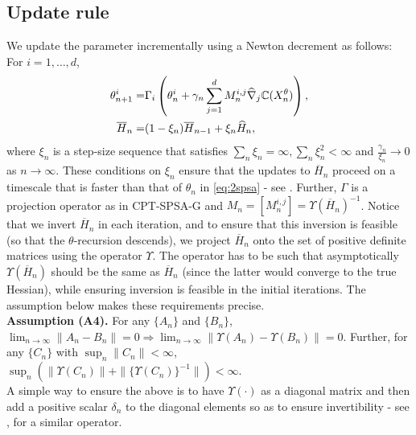 \subsection{Update rule}
We update the parameter incrementally using a Newton decrement as follows: For $i=1,\ldots,d$,
\begin{align}
\label{eq:2spsa}
\theta^{i}_{n+1} =& \Gamma_{i}\left(\theta^{i}_n + \gamma_n \sum_{j=1}^{d} M_n^{i,j} \widehat \nabla_{j} \mathbb{C}(X^\theta_n)\right), \\
\overline H_n = & (1-\xi_n) \overline H_{n-1} + \xi_n \widehat H_n,\label{eq:2spsa-H}
\end{align}
where $\xi_n$ is a step-size sequence that satisfies 
$\sum_{n} \xi_n = \infty, \sum_n \xi_n^2 < \infty$ and $\frac{\gamma_n}{\xi_n}\rightarrow 0$ as $n\rightarrow \infty$. These conditions on $\xi_n$ ensure that the updates to $\overline H_n$ proceed on a timescale that is faster than that of $\theta_n$ in \eqref{eq:2spsa} - see \cite[Chapter 6]{borkar2008stochastic}.
Further, $\Gamma$ is a projection operator as in CPT-SPSA-G and  $M_n = [M_n^{i,j}] = \Upsilon(\overline H_n)^{-1}$.
Notice that we invert $\overline H_n$ in each iteration, and to ensure that this inversion is feasible (so that the $\theta$-recursion descends), we project $\overline H_n$ onto the set of positive definite matrices using the operator $\Upsilon$. The operator has to be such that asymptotically $\Upsilon(\overline H_n)$ should be the same as $\overline H_n$ (since the latter would converge to the true Hessian), while ensuring inversion is feasible in the initial iterations.  The assumption below makes these requirements precise.\\[1ex]
\textbf{Assumption (A4).}  For any $\{A_n\}$ and $\{B_n\}$,
${\displaystyle \lim_{n\rightarrow \infty} \left\| A_n-B_n \right\|}= 0 \Rightarrow {\displaystyle \lim_{n\rightarrow \infty} \parallel \Upsilon(A_n)- \Upsilon(B_n) \parallel}= 0$. Further, for any $\{C_n\}$  with
${\displaystyle \sup_n \parallel C_n\parallel}<\infty$,
${\displaystyle \sup_n \left(\parallel \Upsilon(C_n)\parallel + \parallel \{\Upsilon(C_n)\}^{-1} \parallel\right) < \infty}$.
\\[0.5ex]
A simple way to ensure the above is to have $\Upsilon(\cdot)$ as a diagonal matrix and then add a positive scalar $\delta_n$ to the diagonal elements so as to ensure invertibility  - see \cite{gill1981practical}, \cite{spall2000adaptive} for a similar operator.

